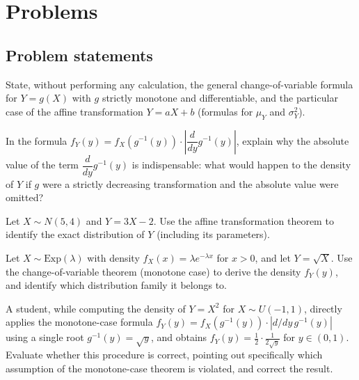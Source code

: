 \section*{Problems}

\subsection*{Problem statements}

\begin{problema}
	\label{prob:d3727e9}
	State, without performing any calculation, the general change-of-variable formula for $Y=g(X)$ with $g$ strictly monotone and differentiable, and the particular case of the affine transformation $Y=aX+b$ (formulas for $\mu_Y$ and $\sigma_Y^2$).
\end{problema}

\begin{problema}
	\label{prob:fbf2d01}
	In the formula $f_Y(y) = f_X(g^{-1}(y))\cdot\left|\dfrac{d}{dy}g^{-1}(y)\right|$, explain why the absolute value of the term $\dfrac{d}{dy}g^{-1}(y)$ is indispensable: what would happen to the density of $Y$ if $g$ were a strictly decreasing transformation and the absolute value were omitted?
\end{problema}

\begin{problema}
	\label{prob:d795060}
	Let $X \sim N(5,4)$ and $Y=3X-2$. Use the affine transformation theorem to identify the exact distribution of $Y$ (including its parameters).
\end{problema}

\begin{problema}
	\label{prob:182603c}
	Let $X \sim \text{Exp}(\lambda)$ with density $f_X(x)=\lambda e^{-\lambda x}$ for $x>0$, and let $Y=\sqrt{X}$. Use the change-of-variable theorem (monotone case) to derive the density $f_Y(y)$, and identify which distribution family it belongs to.
\end{problema}

\begin{problema}
	\label{prob:5ce800e}
	A student, while computing the density of $Y=X^2$ for $X\sim U(-1,1)$, directly applies the monotone-case formula $f_Y(y) = f_X(g^{-1}(y))\cdot|d/dy\,g^{-1}(y)|$ using a single root $g^{-1}(y)=\sqrt{y}$, and obtains $f_Y(y) = \frac{1}{2}\cdot\frac{1}{2\sqrt{y}}$ for $y\in(0,1)$. Evaluate whether this procedure is correct, pointing out specifically which assumption of the monotone-case theorem is violated, and correct the result.
\end{problema}

